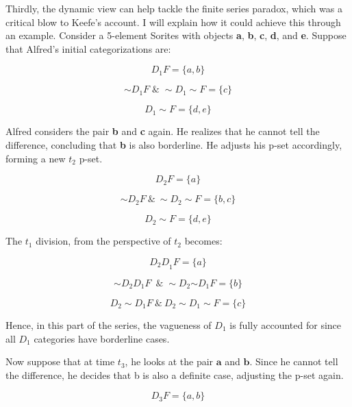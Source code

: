 Thirdly, the dynamic view can help tackle the finite series paradox,
which was a critical blow to Keefe's account. I will explain how it
could achieve this through an example. Consider a 5-element Sorites with
objects \textbf{a}, \textbf{b}, \textbf{c}, \textbf{d}, and \textbf{e}.
Suppose that Alfred's initial categorizations are:

\[D_{1}F = \{ a,b\}\]

\[{\sim}D_{1}F\; \& \; {\sim}D_{1}{\sim}F = \{ c\}\]

\[D_{1}{\sim}F = \{ d,e\}\]

Alfred considers the pair \textbf{b} and \textbf{c} again. He realizes
that he cannot tell the difference, concluding that \textbf{b} is also
borderline. He adjusts his p-set accordingly, forming a new \(t_{2}\)
p-set.

\[D_{2}F = \{ a\}\]

\[{\sim}D_{2}F\ \&\ {\sim}D_{2}{\sim}F = \{ b,c\}\]

\[D_{2}{\sim}F = \{ d,e\}\]

\begin{center}
  \end{center}
 
The \(t_{1}\) division, from the perspective of \(t_{2}\) becomes:

\emph{\hfill\break
}\[{D_{2}D}_{1}F = \{ a\}\]

\[{\sim}D_{2}D_{1}F\ \; \& \; {\sim}D_{2}{{\sim}D}_{1}F = \{ b\}\]

\[D_{2}{\sim}D_{1}F\ \&\ D_{2}{\sim}D_{1}{\sim}F = \{ c\}\]

\begin{center}
  \end{center}
Hence, in this part of the series, the vagueness of \(D_{1}\) is fully
accounted for since all \(D_{1}\) categories have borderline cases.

Now suppose that at time \(t_{3}\), he looks at the pair $\mathbf{a}$ and
$\mathbf{b}$. Since he cannot tell the difference, he decides that b is
also a definite case, adjusting the p-set again.

\[D_{3}F = \{ a,b\}\]

